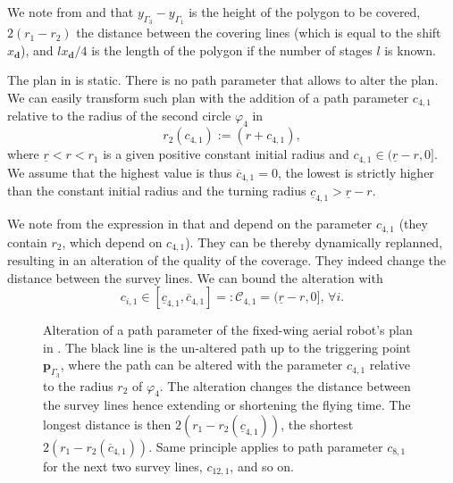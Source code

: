 We note from  and  that $y_{\Gamma_3}-y_{\Gamma_1}$ is the height of the polygon to be covered, $2(r_1-r_2)$ the distance between the covering lines (which is equal to the shift $x_\mathbf{d}$), and $lx_\mathbf{d}/4$ is the length of the polygon if the number of stages $l$ is known.

The plan in  is static. There is no path parameter that allows to alter the plan. We can easily transform such plan with the addition of a path parameter $c_{4,1}$ relative to the radius of the second circle $\varphi_4$ in 
\begin{equation}\label{eq:radius-dynamic}
  r_2(c_{4,1}):=(r+c_{4,1}),
\end{equation}
where $\underline{r}<r<r_1$ is a given positive constant initial radius and $c_{4,1}\in(\underline{r}-r,0]$. We assume that the highest value is thus $\overline{c}_{4,1}=0$, the lowest is strictly higher than the constant initial radius and the turning radius $\underline{c}_{4,1}>\underline{r}-r$.

We note from the expression in  that  and  depend on the parameter $c_{4,1}$ (they contain $r_2$, which depend on $c_{4,1}$). They can be thereby dynamically replanned, resulting in an alteration of the quality of the coverage. They indeed change the distance between the survey lines.
We can bound the alteration with 
\begin{equation}\label{eq:path-const-c}
  c_{i,1}\in[\underline{c}_{4,1},\overline{c}_{4,1}]=:\mathcal{C}_{4,1}=(\underline{r}-r,0],\,\forall i.
\end{equation} 

\begin{sidewaysfigure}
  \rotatesidewayslabel
  \centering
  
  \caption[Alteration of a path parameter of the fixed-wing aerial robot's plan]{Alteration of a path parameter of the fixed-wing aerial robot's plan in . The black line is the un-altered path up to the triggering point $\mathbf{p}_{\Gamma_3}$, where the path can be altered with the parameter $c_{4,1}$ relative to the radius $r_2$ of $\varphi_4$. The alteration changes the distance between the survey lines hence extending or shortening the flying time. The longest distance is then $2(r_1-r_2(\underline{c}_{4,1}))$, the shortest $2(r_1-r_2(\overline{c}_{4,1}))$. Same principle applies to path parameter $c_{8,1}$ for the next two survey lines, $c_{12,1}$, and so on.}
  \label{fig:plot5}
\end{sidewaysfigure}

